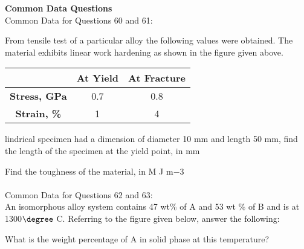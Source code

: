 \bigskip 
\textbf{Common Data Questions}\\
Common Data for Questions 60 and 61:\\

From tensile test of a particular alloy the following values were obtained. The material exhibits linear work hardening as shown in the figure given above.

\begin{tabular}{|c|c|c|}
        \hline
        & \textbf{At Yield} & \textbf{At Fracture} \\ \hline
        \textbf{Stress, GPa} & 0.7 & 0.8 \\ \hline
        \textbf{Strain, \%} & 1 & 4 \\ \hline
\end{tabular}


lindrical specimen had a dimension of diameter 10 mm and length 50 mm, find the length of the specimen at the yield point, in mm
\bigskip
\item Find the toughness of the material, in M J m${-3}$\\
\bigskip
\\
Common Data for Questions 62 and 63:\\
An isomorphous alloy system contains 47 wt\% of A and 53 wt \% of B and is at 1300$\degree$ C. Referring to the figure given below, answer the following:
\item What is the weight percentage of A in solid phase at this temperature?

